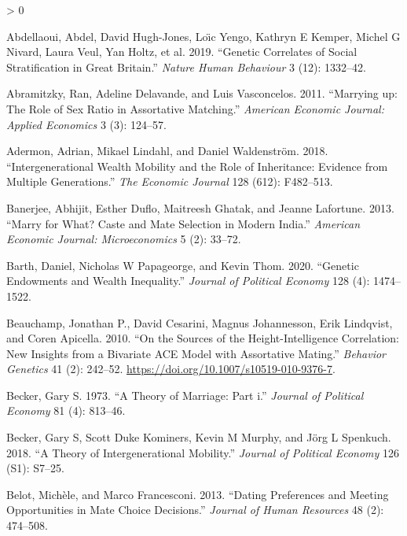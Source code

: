 \documentclass[
]{article}
\newlength{\cslhangindent}
\newenvironment{CSLReferences}[2] %
 {%
  \setlength{\parindent}{0pt}
  \ifodd #1 \everypar{\setlength{\hangindent}{\cslhangindent}}\ignorespaces\fi
  \ifnum #2 > 0
  \setlength{\parskip}{#2\baselineskip}
  \fi
 }%
 {}
\begin{document}
\hypertarget{refs}{}
\begin{CSLReferences}{1}{0}
\leavevmode\hypertarget{ref-abdellaoui2019genetic}{}%
Abdellaoui, Abdel, David Hugh-Jones, Loı̈c Yengo, Kathryn E Kemper, Michel G Nivard, Laura Veul, Yan Holtz, et al. 2019. {``Genetic Correlates of Social Stratification in Great Britain.''} \emph{Nature Human Behaviour} 3 (12): 1332--42.

\leavevmode\hypertarget{ref-abramitzky2011marrying}{}%
Abramitzky, Ran, Adeline Delavande, and Luis Vasconcelos. 2011. {``Marrying up: The Role of Sex Ratio in Assortative Matching.''} \emph{American Economic Journal: Applied Economics} 3 (3): 124--57.

\leavevmode\hypertarget{ref-adermon2018intergenerational}{}%
Adermon, Adrian, Mikael Lindahl, and Daniel Waldenström. 2018. {``Intergenerational Wealth Mobility and the Role of Inheritance: Evidence from Multiple Generations.''} \emph{The Economic Journal} 128 (612): F482--513.

\leavevmode\hypertarget{ref-banerjee2013marry}{}%
Banerjee, Abhijit, Esther Duflo, Maitreesh Ghatak, and Jeanne Lafortune. 2013. {``Marry for What? Caste and Mate Selection in Modern India.''} \emph{American Economic Journal: Microeconomics} 5 (2): 33--72.

\leavevmode\hypertarget{ref-barth2020genetic}{}%
Barth, Daniel, Nicholas W Papageorge, and Kevin Thom. 2020. {``Genetic Endowments and Wealth Inequality.''} \emph{Journal of Political Economy} 128 (4): 1474--1522.

\leavevmode\hypertarget{ref-Beauchamp_2010}{}%
Beauchamp, Jonathan P., David Cesarini, Magnus Johannesson, Erik Lindqvist, and Coren Apicella. 2010. {``On the Sources of the Height-Intelligence Correlation: New Insights from a Bivariate {ACE} Model with Assortative Mating.''} \emph{Behavior Genetics} 41 (2): 242--52. \url{https://doi.org/10.1007/s10519-010-9376-7}.

\leavevmode\hypertarget{ref-becker1973theory}{}%
Becker, Gary S. 1973. {``A Theory of Marriage: Part i.''} \emph{Journal of Political Economy} 81 (4): 813--46.

\leavevmode\hypertarget{ref-becker2018theory}{}%
Becker, Gary S, Scott Duke Kominers, Kevin M Murphy, and Jörg L Spenkuch. 2018. {``A Theory of Intergenerational Mobility.''} \emph{Journal of Political Economy} 126 (S1): S7--25.

\leavevmode\hypertarget{ref-belot2013dating}{}%
Belot, Michèle, and Marco Francesconi. 2013. {``Dating Preferences and Meeting Opportunities in Mate Choice Decisions.''} \emph{Journal of Human Resources} 48 (2): 474--508.


\end{CSLReferences}
\end{document}
